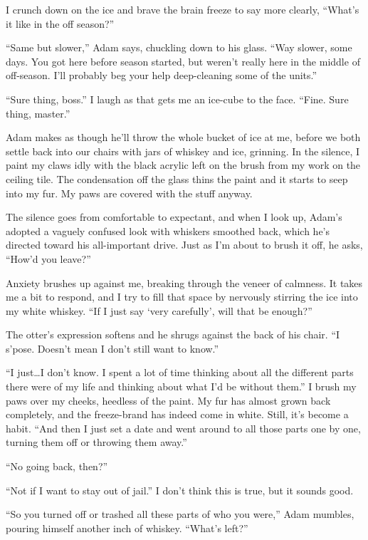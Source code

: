 I crunch down on the ice and brave the brain freeze to say more clearly, ``What's it like in the off season?''

``Same but slower,'' Adam says, chuckling down to his glass. ``Way slower, some days. You got here before season started, but weren't really here in the middle of off-season. I'll probably beg your help deep-cleaning some of the units.''

``Sure thing, boss.'' I laugh as that gets me an ice-cube to the face. ``Fine. Sure thing, master.''

Adam makes as though he'll throw the whole bucket of ice at me, before we both settle back into our chairs with jars of whiskey and ice, grinning. In the silence, I paint my claws idly with the black acrylic left on the brush from my work on the ceiling tile. The condensation off the glass thins the paint and it starts to seep into my fur. My paws are covered with the stuff anyway.

The silence goes from comfortable to expectant, and when I look up, Adam's adopted a vaguely confused look with whiskers smoothed back, which he's directed toward his all-important drive. Just as I'm about to brush it off, he asks, ``How'd you leave?''

Anxiety brushes up against me, breaking through the veneer of calmness. It takes me a bit to respond, and I try to fill that space by nervously stirring the ice into my white whiskey. ``If I just say `very carefully', will that be enough?''

The otter's expression softens and he shrugs against the back of his chair. ``I s'pose. Doesn't mean I don't still want to know.''

``I just\ldots{}I don't know. I spent a lot of time thinking about all the different parts there were of my life and thinking about what I'd be without them.'' I brush my paws over my cheeks, heedless of the paint. My fur has almost grown back completely, and the freeze-brand has indeed come in white. Still, it's become a habit. ``And then I just set a date and went around to all those parts one by one, turning them off or throwing them away.''

``No going back, then?''

``Not if I want to stay out of jail.'' I don't think this is true, but it sounds good.

``So you turned off or trashed all these parts of who you were,'' Adam mumbles, pouring himself another inch of whiskey. ``What's left?''

